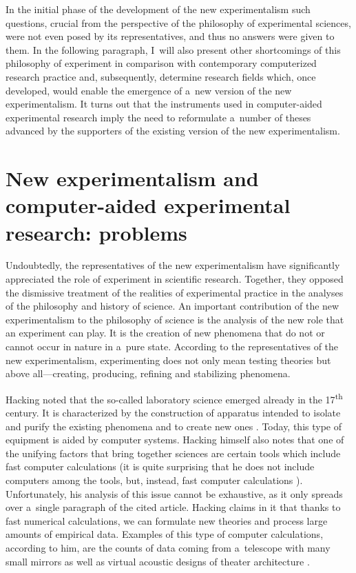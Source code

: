 In the initial phase of the development of the new experimentalism such questions, crucial from the perspective of the philosophy of experimental sciences, were not even posed by its representatives, and thus no answers were given to them. In the following paragraph, I~will also present other shortcomings of this philosophy of experiment in comparison with contemporary computerized research practice and, subsequently, determine research fields which, once developed, would enable the emergence of a~new version of the new experimentalism. It turns out that the instruments used in computer-aided experimental research imply the need to reformulate a~number of theses advanced by the supporters of the existing version of the new experimentalism.



\section{New experimentalism and computer-aided experimental research: problems}

Undoubtedly, the representatives of the new experimentalism have significantly appreciated the role of experiment in scientific research. Together, they opposed the dismissive treatment of the realities of experimental practice in the analyses of the philosophy and history of science. An important contribution of the new experimentalism to the philosophy of science is the analysis of the new role that an experiment can play. It is the creation of new phenomena that do not or cannot occur in nature in a~pure state. According to the representatives of the new experimentalism, experimenting does not only mean testing theories but above all---creating, producing, refining and stabilizing phenomena.



Hacking noted that the so-called laboratory science emerged already in the 17\textsuperscript{th} century. It is characterized by the construction of apparatus intended to isolate and purify the existing phenomena and to create new ones 
\parencite[][]{hacking_disunities_1996}. %
 Today, this type of equipment is aided by computer systems. Hacking himself also notes that one of the unifying factors that bring together sciences are certain tools which include fast computer calculations (it is quite surprising that he does not include computers among the tools, but, instead, fast computer calculations 
\parencite[][]{hacking_disunities_1996}%
). Unfortunately, his analysis of this issue cannot be exhaustive, as it only spreads over a~single paragraph of the cited article. Hacking claims in it that thanks to fast numerical calculations, we can formulate new theories and process large amounts of empirical data. Examples of this type of computer calculations, according to him, are the counts of data coming from a~telescope with many small mirrors as well as virtual acoustic designs of theater architecture 
\parencite[][]{hacking_disunities_1996}.%




